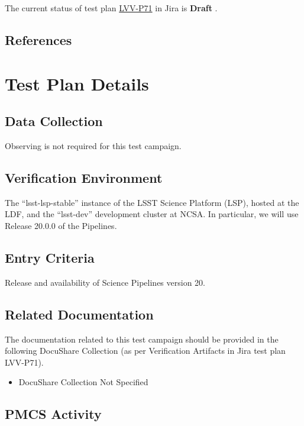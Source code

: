 \documentclass[DM,lsstdraft,STR,toc]{lsstdoc}
\begin{document}
The current status of test plan \href{https://jira.lsstcorp.org/secure/Tests.jspa\#/testPlan/LVV-P71}{LVV-P71} in Jira is \textbf{ Draft }.

\subsection{References}
\label{sect:references}
\renewcommand{\refname}{}



\newpage
\section{Test Plan Details}
\label{sect:testplan}


\subsection{Data Collection}

  Observing is not required for this test campaign.

\subsection{Verification Environment}
\label{sect:hwconf}
  The ``lsst-lsp-stable'' instance of the LSST Science Platform (LSP),
hosted at the LDF, and the ``lsst-dev'' development cluster at NCSA. In
particular, we will use Release 20.0.0 of the Pipelines.

  \subsection{Entry Criteria}
  Release and availability of Science Pipelines version 20.



\subsection{Related Documentation}

The documentation related to this test campaign should be provided in the following DocuShare Collection
(as per Verification Artifacts in Jira test plan LVV-P71).

\begin{itemize}
\item DocuShare Collection Not Specified
\end{itemize}



\subsection{PMCS Activity}
\end{document}
